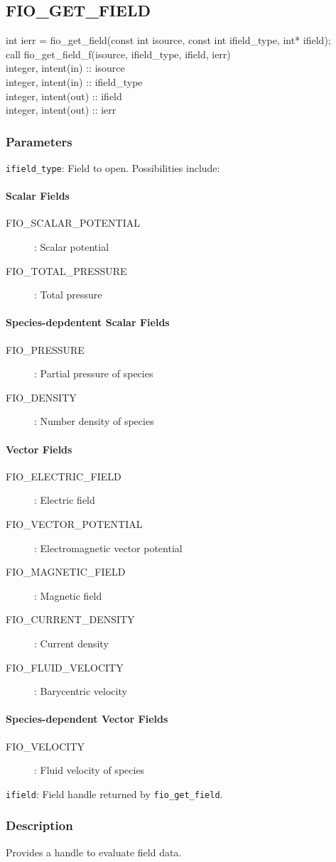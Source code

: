 \documentclass{article}
\newcommand{\parameter}[2]{\noindent \texttt{#1}: #2}
\newcommand{\function}[4]{
  \subsection{\uppercase{#1}}

  #2

  \subsubsection{Parameters}
  #3

  \subsubsection{Description}
  #4
}
\begin{document}
\function{fio\_get\_field}
{
\noindent
int ierr = fio\_get\_field(const int isource, const int ifield\_type, int* ifield);\\

\noindent
call fio\_get\_field\_f(isource, ifield\_type, ifield, ierr)\\
integer, intent(in) :: isource\\
integer, intent(in) :: ifield\_type\\
integer, intent(out) :: ifield\\
integer, intent(out) :: ierr
}
{
\parameter{ifield\_type}{Field to open.  Possibilities include:

\paragraph{Scalar Fields}
\begin{description}
\item[FIO\_SCALAR\_POTENTIAL]: Scalar potential
\item[FIO\_TOTAL\_PRESSURE]: Total pressure
\end{description}

\paragraph{Species-depdentent Scalar Fields}
\begin{description}
\item[FIO\_PRESSURE]: Partial pressure of species
\item[FIO\_DENSITY]: Number density of species
\end{description}

\paragraph{Vector Fields}
\begin{description}
\item[FIO\_ELECTRIC\_FIELD]: Electric field
\item[FIO\_VECTOR\_POTENTIAL]: Electromagnetic vector potential
\item[FIO\_MAGNETIC\_FIELD]: Magnetic field
\item[FIO\_CURRENT\_DENSITY]: Current density
\item[FIO\_FLUID\_VELOCITY]: Barycentric velocity
\end{description}

\paragraph{Species-dependent Vector Fields}
\begin{description}
\item[FIO\_VELOCITY]: Fluid velocity of species
\end{description}
}
\parameter{ifield}{Field handle returned by \texttt{fio\_get\_field}.}
}
{
Provides a handle to evaluate field data.
}
\end{document}
